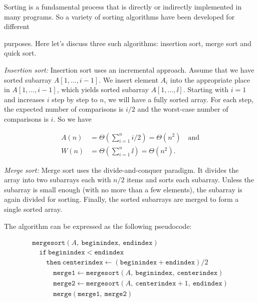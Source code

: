 \begin{solution}
Sorting is a fundamental process that is directly or indirectly implemented in many
programs. So a variety of sorting algorithms have been developed for different


purposes. Here let's discuss three such algorithms: insertion sort, merge sort and quick
sort.

\emph{Insertion sort:} Insertion sort uses an incremental approach. Assume that we have sorted
subarray $A[1,\ldots,i-1]$. We insert element $A_i$ into the appropriate place in
$A[1,\ldots,i-1]$, which yields sorted subarray $A[1,\ldots,\ii]$. Starting with $i=1$ and increases $i$ step by step
to $n$, we will have a fully sorted array. For each step, the expected number of comparisons
is $i/2$ and the worst-case number of comparisons is $i$. So we have

\[
\begin{aligned}
A(n)&=\Theta\left(\sum_{i=1}^{n}i/2\right)=\Theta(n^2)\quad\text{and}\\
W(n)&=\Theta\left(\sum_{i=1}^{n}\ii\right)=\Theta(n^2).
\end{aligned}
\]

\emph{Merge sort:} Merge sort uses the divide-and-conquer paradigm. It divides the array into
two subarrays each with $n/2$ items and sorts each subarray. Unless the subarray is small
enough (with no more than a few elements), the subarray is again divided for sorting.
Finally, the sorted subarrays are merged to form a single sorted array.

The algorithm can be expressed as the following pseudocode:

\[
\begin{array}{l}
\mathtt{mergesort}(A,\ \mathtt{beginindex},\ \mathtt{endindex})\\
\quad\mathtt{if\ beginindex}<\mathtt{endindex}\\
\qquad\mathtt{then\ centerindex}\leftarrow(\mathtt{beginindex}+\mathtt{endindex})/2\\
\qquad\quad\mathtt{merge1}\leftarrow\mathtt{mergesort}(A,\ \mathtt{beginindex},\ \mathtt{centerindex})\\
\qquad\quad\mathtt{merge2}\leftarrow\mathtt{mergesort}(A,\ \mathtt{centerindex}+1,\ \mathtt{endindex})\\
\qquad\quad\mathtt{merge}(\mathtt{merge1},\ \mathtt{merge2})
\end{array}
\]


\end{solution}
